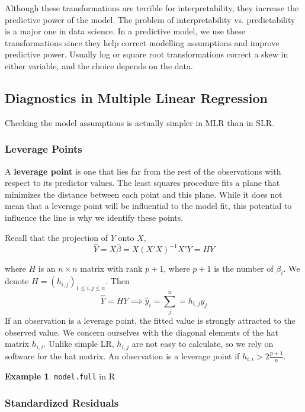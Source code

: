\documentclass[12pt, a4paper]{article}
\theoremstyle{definition}
\newtheorem{example}{Example}
\newcommand{\imp}{\implies}
\newcommand{\f}{\frac}
\begin{document}
  	Although these transformations are terrible for interpretability, they increase the predictive power of the model. The problem of interpretability vs. predictability is a major one in data science. In a predictive model, we use these transformations since they help correct modelling assumptions and improve predictive power. Usually log or square root transformations correct a skew in either variable, and the choice depends on the data. 
  	
  	
  	
  	
  	
  	
  	\subsection{Diagnostics in Multiple Linear Regression}
  	
  	Checking the model assumptions is actually simpler in MLR than in SLR.
  	
  	\subsubsection{Leverage Points}
  	
  	A {\bf leverage point} is one that lies far from the rest of the observations with respect to its predictor values. The least squares procedure fits a plane that minimizes the distance between each point and this plane. While it does not mean that a leverage point will be influential to the model fit, this potential to influence the line is why we identify these points.
  	
  	Recall that the projection of $Y$ onto $X$, 
  		$$
  			\hat Y = X \hat \beta = X(X'X)^{-1}X' Y = HY
  		$$
  	
  	where $H$ is an $n \times n$ matrix with rank $p+1$, where $p+1$ is the number of $\beta_i$. We denote $H = (h_{i,j})_{1 \leq i,j \leq n}$. Then 
  	$$\hat Y = HY \imp \hat y_i = \sum_{j}^n = h_{i,j}y_j $$
  	If an observation is a leverage point, the fitted value is strongly attracted to the observed value. We concern ourselves with the diagonal elements of the hat matrix $h_{i,i}$. Unlike simple LR, $h_{i,j}$ are not easy to calculate, so we rely on software for the hat matrix. An observation is a leverage point if $h_{i,i} > 2 \f{p+1}{n}$.
  	
  	\begin{example}
  		\verb*|model.full| in R
  	\end{example}
  
  	\subsubsection{Standardized Residuals}
  	
\end{document}
